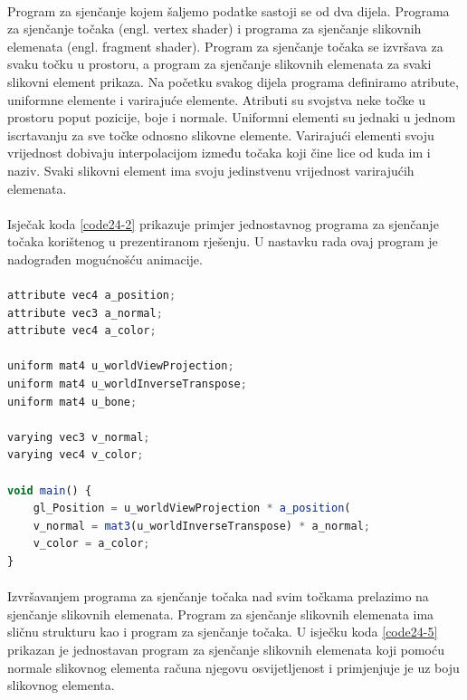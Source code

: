 \documentclass[times, utf8, diplomski]{fer}
\begin{document}
\paragraph{}
Program za sjenčanje kojem šaljemo podatke sastoji se od dva dijela. Programa za sjenčanje točaka (engl. vertex shader) i programa za sjenčanje slikovnih elemenata (engl. fragment shader). Program za sjenčanje točaka se izvršava za svaku točku u prostoru, a program za sjenčanje slikovnih elemenata za svaki slikovni element prikaza. Na početku svakog dijela programa definiramo atribute, uniformne elemente i varirajuće elemente. Atributi su svojstva neke točke u prostoru poput pozicije, boje i normale. Uniformni elementi su jednaki u jednom iscrtavanju za sve točke odnosno slikovne elemente. Varirajući elementi svoju vrijednost dobivaju interpolacijom između točaka koji čine lice od kuda im i naziv. Svaki slikovni element ima svoju jedinstvenu vrijednost varirajućih elemenata.

\paragraph{}
Isječak koda \ref{code24-2} prikazuje primjer jednostavnog programa za sjenčanje točaka korištenog u prezentiranom rješenju. U nastavku rada ovaj program je nadograđen mogućnošću animacije.

\paragraph{}
\begin{lstlisting}[language=Javascript,caption=Program za sjenčanje točaka,label=code24-4]
attribute vec4 a_position;
attribute vec3 a_normal;
attribute vec4 a_color;

uniform mat4 u_worldViewProjection;
uniform mat4 u_worldInverseTranspose;
uniform mat4 u_bone;

varying vec3 v_normal;
varying vec4 v_color;

void main() {
    gl_Position = u_worldViewProjection * a_position(
    v_normal = mat3(u_worldInverseTranspose) * a_normal;
    v_color = a_color;
}
\end{lstlisting}

\paragraph{}
Izvršavanjem programa za sjenčanje točaka nad svim točkama prelazimo na sjenčanje slikovnih elemenata. Program za sjenčanje slikovnih elemenata ima sličnu strukturu kao i program za sjenčanje točaka. U isječku koda \ref{code24-5} prikazan je jednostavan program za sjenčanje slikovnih elemenata koji pomoću normale slikovnog elementa računa njegovu osvijetljenost i primjenjuje je uz boju slikovnog elementa.
\end{document}

